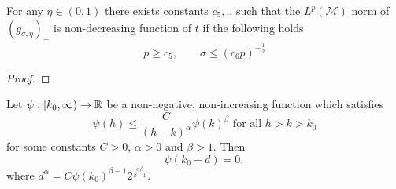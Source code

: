     \begin{proposition}\label{Lpbound}
        For any $ \eta \in (0,1) $ there exists constants $ c_{5},.. $ such that the $ L^{p}( \mathcal{M}) $ norm of $ (g_{\sigma, \eta})_{+} $ is non-decreasing function of $ t $ if the following holds 
        \[ p \ge c_{5}, \qquad \sigma \le (c_{6}p)^{- \frac{1}{2}} \]
        
    \end{proposition}
    \begin{proof}
        
    \end{proof}

    \begin{lemma}
         Let $ \psi: [k_{0},\infty) \to \mathbb{R} $ be a non-negative, non-increasing function which satisfies \begin{equation}
            \psi(h) \le \frac{C}{(h-k)^{\alpha}} \psi(k)^{\beta} \text{ for all } h> k >k_{0}
        \end{equation}
        for some constants $ C>0 $, $ \alpha > 0 $ and $ \beta >1 $. Then \begin{equation}
            \psi(k_{0}+d) = 0,
        \end{equation}
        where $ d^{\alpha} = C\psi(k_{0})^{\beta-1}2^{\frac{\alpha \beta}{\beta -1}} $.
    \end{lemma}


